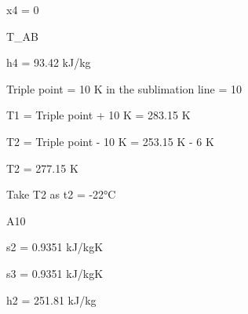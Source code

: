 x4 = 0

T_AB

h4 = 93.42 kJ/kg

Triple point = 10 K in the sublimation line = 10

T1 = Triple point + 10 K = 283.15 K

T2 = Triple point - 10 K = 253.15 K - 6 K

T2 = 277.15 K

Take T2 as t2 = -22°C

A10

s2 = 0.9351 kJ/kgK

s3 = 0.9351 kJ/kgK

h2 = 251.81 kJ/kg